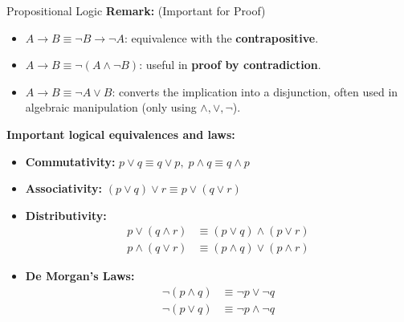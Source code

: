 \documentclass[dvipsnames]{beamer}
\theoremstyle{plain}
\theoremstyle{definition}
\begin{document}
\begin{frame}{Propositional Logic}
\textbf{Remark:} (Important for Proof)
\begin{itemize}
    \item $A \to B \equiv \lnot B \to \lnot A$: equivalence with the \textbf{contrapositive}.  
    \item $A \to B \equiv \lnot(A \land \lnot B)$: useful in \textbf{proof by contradiction}.  
    \item $A \to B \equiv \lnot A \lor B$: converts the implication into a disjunction, often used in algebraic manipulation (only using $\land,\lor,\lnot$).  
\end{itemize}
\vspace{0.5em}
\textbf{Important logical equivalences and laws:}
\begin{itemize}
  \item \textbf{Commutativity:} $p \lor q \equiv q \lor p, \; p \land q \equiv q \land p$
  \item \textbf{Associativity:} $(p \lor q) \lor r \equiv p \lor (q \lor r)$
  \item \textbf{Distributivity:} 
  \begin{align*}
    p \lor (q \land r) &\equiv (p \lor q) \land (p \lor r)\\
    p \land (q \lor r) &\equiv (p \land q) \lor (p \land r)
  \end{align*}
  \item \textbf{De Morgan's Laws:} 
  \begin{align*}
    \lnot(p \land q) &\equiv \lnot p \lor \lnot q\\
    \lnot(p \lor q) &\equiv \lnot p \land \lnot q
  \end{align*}
\end{itemize}

\end{frame}
\end{document}
